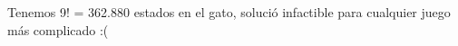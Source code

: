 \documentclass[preview]{standalone}
\begin{document}
\begin{center}
Tenemos 9! = 362.880 estados en el gato, solució infactible para cualquier juego más complicado :(
\end{center}
\end{document}
